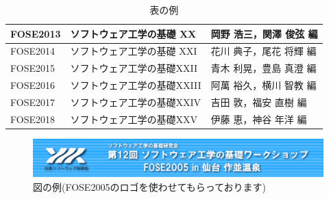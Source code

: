 \documentclass{fose2019}           %
\begin{document}
\begin{table}[htbp]
  \centering
  \caption{表の例} \label{tab:example}
  \begin{tabular}{|l|l|l|}\hline
    FOSE2013 & ソフトウェア工学の基礎 XX & 岡野 浩三，関澤 俊弦 編 \\ \hline
    FOSE2014 & ソフトウェア工学の基礎 XXI& 花川 典子，尾花 将輝 編\\ \hline
    FOSE2015 & ソフトウェア工学の基礎XXII & 青木 利晃，豊島 真澄 編\\ \hline
    FOSE2016 & ソフトウェア工学の基礎XXIII & 阿萬 裕久，横川 智教 編\\ \hline
    FOSE2017 & ソフトウェア工学の基礎XXIV & 吉田 敦，福安 直樹 編\\ \hline
    FOSE2018 & ソフトウェア工学の基礎XXV & 伊藤 恵，神谷 年洋  編\\ \hline
  \end{tabular}
\end{table}

\begin{figure}[htbp]
  \centering
  \includegraphics[width=\textwidth]{fose2005logo.eps}
  \caption{図の例(FOSE2005のロゴを使わせてもらっております)}
  \label{fig:example}
\end{figure}
\end{document}
